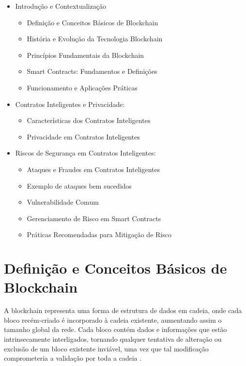 \begin{itemize}
\item Introdução e Contextualização
	\begin{itemize}
 \item             Definição e Conceitos Básicos de Blockchain 
          \item História e Evolução da Tecnologia Blockchain
	   \item Princípios Fundamentais da Blockchain 
	   \item Smart Contracts: Fundamentos e Definições
	   \item Funcionamento e Aplicações Práticas

        \end{itemize}
\item Contratos Inteligentes e Privacidade: 
	\begin{itemize}
            \item Características dos Contratos Inteligentes
     \item Privacidade em Contratos Inteligentes 
        \end{itemize}
\item Riscos de Segurança em Contratos Inteligentes:
	\begin{itemize}	
            \item Ataques e Fraudes em Contratos Inteligentes
	    \item Exemplo de ataques bem sucedidos
     \item Vulnerabilidade Comum
     \item Gerenciamento de Risco em Smart Contracts
     \item Práticas Recomendadas para Mitigação de Risco

	\end{itemize}

\end{itemize}



\section{\label{sec:secao1}Definição e Conceitos Básicos de Blockchain}
A blockchain representa uma forma de estrutura de dados em cadeia, onde cada bloco recém-criado é incorporado à cadeia existente, aumentando assim o tamanho global da rede. Cada bloco contém dados e informações que estão intrinsecamente interligados, tornando qualquer tentativa de alteração ou exclusão de um bloco existente inviável, uma vez que tal modificação comprometeria a validação por toda a cadeia \cite{exame}.


